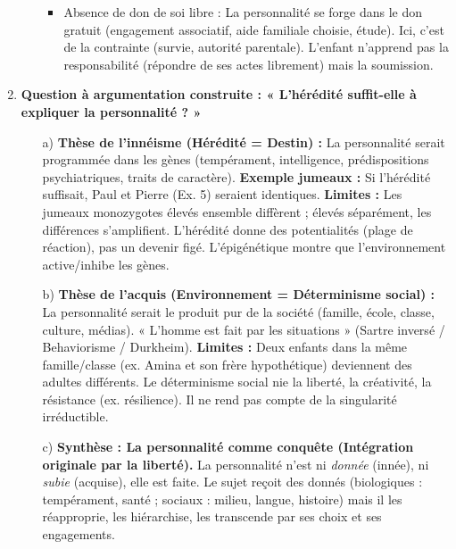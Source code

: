 \documentclass[11pt]{article}
\newcommand{\cle}[1]{{\popxbold\color{popdark}#1}}
\begin{document}
\begin{corrige}
\begin{enumerate}
\begin{itemize}
\begin{itemize}
            \item \cle{Absence de don de soi libre :} La personnalité se forge dans le \cle{don gratuit} (engagement associatif, aide familiale choisie, étude). Ici, c'est de la \cle{contrainte} (survie, autorité parentale). L'enfant n'apprend pas la \cle{responsabilité} (répondre de ses actes librement) mais la \cle{soumission}.
        \end{itemize}
    \end{itemize}

    \item \textbf{Question à argumentation construite : « L'hérédité suffit-elle à expliquer la personnalité ? »}
    \begin{itemize}
        \item[a)] \textbf{Thèse de l'innéisme (Hérédité = Destin) :} La personnalité serait programmée dans les gènes (tempérament, intelligence, prédispositions psychiatriques, traits de caractère). \textbf{Exemple jumeaux :} Si l'hérédité suffisait, Paul et Pierre (Ex. 5) seraient identiques. \textbf{Limites :} Les jumeaux monozygotes élevés ensemble diffèrent ; élevés séparément, les différences s'amplifient. L'hérédité donne des \cle{potentialités} (plage de réaction), pas un \cle{devenir} figé. L'épigénétique montre que l'environnement active/inhibe les gènes.
        \item[b)] \textbf{Thèse de l'acquis (Environnement = Déterminisme social) :} La personnalité serait le produit pur de la société (famille, école, classe, culture, médias). « L'homme est fait par les situations » (Sartre inversé / Behaviorisme / Durkheim). \textbf{Limites :} Deux enfants dans la même famille/classe (ex. Amina et son frère hypothétique) deviennent des adultes différents. Le déterminisme social nie la \cle{liberté}, la \cle{créativité}, la \cle{résistance} (ex. résilience). Il ne rend pas compte de la \cle{singularité} irréductible.
        \item[c)] \textbf{Synthèse : La personnalité comme \cle{conquête} (Intégration originale par la liberté).} La personnalité n'est ni \emph{donnée} (innée), ni \emph{subie} (acquise), elle est \cle{faite}. Le sujet \cle{reçoit} des donnés (biologiques : tempérament, santé ; sociaux : milieu, langue, histoire) mais il les \cle{réapproprie}, les \cle{hiérarchise}, les \cle{transcende} par ses \cle{choix} et ses \cle{engagements}.
        

\end{itemize}
\end{enumerate}
\end{corrige}
\end{document}
